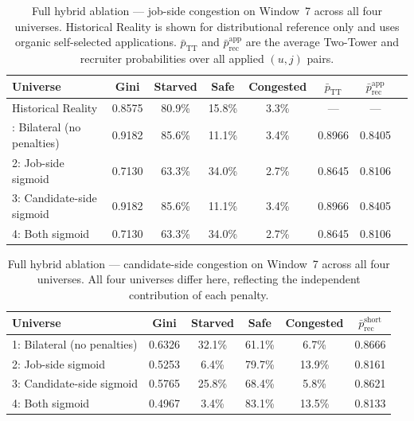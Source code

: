 \begin{appendices}
\begin{table}[htbp]
    \centering
    \caption{Full hybrid ablation --- job-side congestion on Window~7 across
    all four universes. Historical Reality is shown for distributional reference
    only and uses organic self-selected applications.
    $\bar{p}_\text{TT}$ and $\bar{p}_\text{rec}^\text{app}$ are the average Two-Tower and
    recruiter probabilities over all applied $(u,j)$ pairs.}
    \label{tab:app_hybrid_job}
    \small
    \begin{tabular}{lccccccc}
        \toprule
        \textbf{Universe} & \textbf{Gini} & \textbf{Starved} & \textbf{Safe}
            & \textbf{Congested} & $\bar{p}_\text{TT}$ & $\bar{p}_\text{rec}^\text{app}$ \\
        \midrule
        Historical Reality & 0.8575 & 80.9\% & 15.8\% & 3.3\%
            & --- & --- \\
        \addlinespace
        1: Bilateral (no penalties)  & 0.9182 & 85.6\% & 11.1\% & 3.4\%
            & 0.8966 & 0.8405 \\
        2: Job-side sigmoid          & 0.7130 & 63.3\% & 34.0\% & 2.7\%
            & 0.8645 & 0.8106 \\
        3: Candidate-side sigmoid    & 0.9182 & 85.6\% & 11.1\% & 3.4\%
            & 0.8966 & 0.8405 \\
        4: Both sigmoid              & 0.7130 & 63.3\% & 34.0\% & 2.7\%
            & 0.8645 & 0.8106 \\
        \bottomrule
    \end{tabular}
    \par\smallskip
    \raggedright\small
\end{table}

\begin{table}[htbp]
    \centering
    \caption{Full hybrid ablation --- candidate-side congestion on Window~7
    across all four universes. All four universes differ here, reflecting
    the independent contribution of each penalty.}
    \label{tab:app_hybrid_candidate}
    \small
    \begin{tabular}{lccccc}
        \toprule
        \textbf{Universe} & \textbf{Gini} & \textbf{Starved} & \textbf{Safe}
            & \textbf{Congested} & \textbf{$\bar{p}_{\text{rec}}^{\text{short}}$} \\
        \midrule
        1: Bilateral (no penalties) & 0.6326 & 32.1\% & 61.1\% &  6.7\%  & 0.8666 \\
        2: Job-side sigmoid         & 0.5253 &  6.4\% & 79.7\% & 13.9\% & 0.8161 \\
        3: Candidate-side sigmoid   & 0.5765 & 25.8\% & 68.4\% &  5.8\% & 0.8621 \\
        4: Both sigmoid             & 0.4967 &  3.4\% & 83.1\% & 13.5\% & 0.8133 \\
        \bottomrule
    \end{tabular}
\end{table}



\end{appendices}

